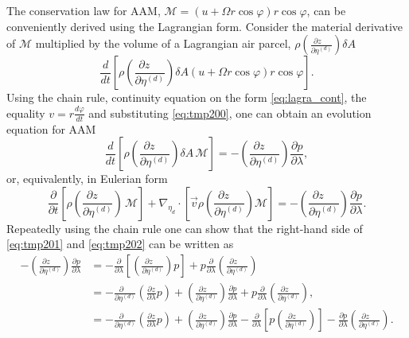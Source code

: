 \documentclass{agujournal}
\begin{document}
{The conservation law for AAM, $\mathcal{M}=\left( u+\Omega r \cos \varphi \right) r \cos \varphi$, can be conveniently derived using the Lagrangian form. Consider the material derivative of $\mathcal{M}$ multiplied by the volume of a Lagrangian air parcel, $\rho \left( \frac{\partial z\quad }{\partial \eta^{(d)}}\right)\delta A$
\begin{equation}
\frac{d}{dt}\left[ \rho \left( \frac{\partial z\quad }{\partial \eta^{(d)}}\right) \delta A \left( u+\Omega r \cos \varphi \right) r \cos \varphi\right].
\end{equation}
Using the chain rule, continuity equation on the form \eqref{eq:lagra_cont}, the equality $v=r\frac{d\varphi}{dt}$ and substituting \eqref{eq:tmp200}, one can obtain an evolution equation for AAM
\begin{equation}
\frac{d}{dt}\left[ \rho \left( \frac{\partial z\quad }{\partial \eta^{(d)}}\right) \delta A\, \mathcal{M} \right]=- \left( \frac{\partial z\quad }{\partial \eta^{(d)}}\right) \frac{\partial p}{\partial \lambda},\label{eq:tmp201}
\end{equation}
or, equivalently, in Eulerian form
\begin{equation}
\frac{\partial}{\partial t}\left[ \rho \left( \frac{\partial z\quad }{\partial \eta^{(d)}}\right) \, \mathcal{M} \right]+\nabla_{\eta_d}\cdot \left[\vec{v} \rho \left( \frac{\partial z\quad }{\partial \eta^{(d)}}\right)  \mathcal{M} \right]=- \left( \frac{\partial z\quad }{\partial \eta^{(d)}}\right) \frac{\partial p}{\partial \lambda}.\label{eq:tmp202}
\end{equation}
Repeatedly using the chain rule one can show that the right-hand side of \eqref{eq:tmp201} and \eqref{eq:tmp202} can be written as
\begin{align}
- \left( \frac{\partial z\quad }{\partial \eta^{(d)}}\right)\frac{\partial p}{\partial \lambda}&=-\frac{\partial }{\partial \lambda}\left[  \left( \frac{\partial z\quad }{\partial \eta^{(d)}}\right) p\right]+p\frac{\partial }{\partial \lambda} \left( \frac{\partial z\quad }{\partial \eta^{(d)}}\right)\\ 
&=-\frac{\partial \quad}{\partial \eta^{(d)}}\left( \frac{\partial z}{\partial \lambda}p\right)+\left( \frac{\partial z\quad }{\partial \eta^{(d)}}\right)\frac{\partial p}{\partial \lambda}+p\frac{\partial }{\partial \lambda}\left( \frac{\partial z\quad }{\partial \eta^{(d)}}\right),\\
&=-\frac{\partial \quad}{\partial \eta^{(d)}}\left( \frac{\partial z}{\partial \lambda}p\right)+\left( \frac{\partial z\quad }{\partial \eta^{(d)}}\right)\frac{\partial p}{\partial \lambda}-\frac{\partial }{\partial \lambda}\left[ p\left( \frac{\partial z\quad }{\partial \eta^{(d)}}\right)\right]-\frac{\partial p}{\partial \lambda}\left( \frac{\partial z\quad }{\partial \eta^{(d)}}\right).\\

\end{align}}
\end{document}
